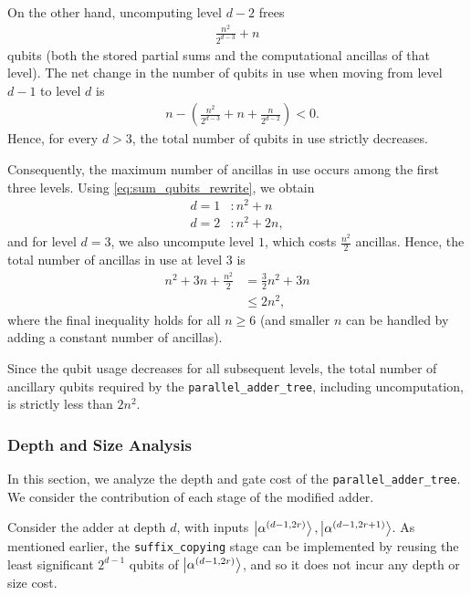 \documentclass[reprint,amsmath,amssymb,aps,pra]{revtex4-2}
\begin{document}
On the other hand, uncomputing level $d-2$ frees
\begin{align}
\frac{n^2}{2^{d-3}} + n 
\end{align}
qubits (both the stored partial sums and the computational ancillas of that level). The net change in the number of qubits in use when moving from level $d-1$ to level $d$ is
\begin{align}
&n
- \left(\frac{n^2}{2^{d-3}} + n + \frac{n}{2^{d-2}}\right)  < 0.
\end{align}
Hence, for every $d > 3$, the total number of qubits in use strictly decreases.


Consequently, the maximum number of ancillas in use occurs among the first three levels. Using \eqref{eq:sum_qubits_rewrite}, we obtain
\begin{align}
    d=1&: n^2+n\\
    d=2&: n^2+2n,
\end{align}
and for level $d=3$, we also uncompute level $1$, which costs $\frac{n^2}{2}$ ancillas. Hence, the total number of ancillas in use at level $3$ is
\begin{align}
    n^2 + 3n + \frac{n^2}{2}
    &= \frac{3}{2}n^2 + 3n \\
    &\le 2n^2,
\end{align}
where the final inequality holds for all $n\ge 6$ (and smaller $n$ can be handled by adding a constant number of ancillas).

Since the qubit usage decreases for all subsequent levels, the total number of ancillary qubits required by the \texttt{parallel\_adder\_tree}, including uncomputation, is strictly less than $2n^2$.

\subsubsection{Depth and Size Analysis}\label{subsec:gate_opt_adder}

In this section, we analyze the depth and gate cost of the \texttt{parallel\_adder\_tree}. We consider the contribution of each stage of the modified adder.

Consider the adder at depth $d$, with inputs $\ket{\alpha^{(d-1,2r)}}, \ket{\alpha^{(d-1,2r+1)}}$. As mentioned earlier, the \texttt{suffix\_copying} stage can be implemented by reusing the least significant $2^{d-1}$ qubits of $\ket{\alpha^{(d-1,2r)}}$, and so it does not incur any depth or size cost. 
\end{document}
